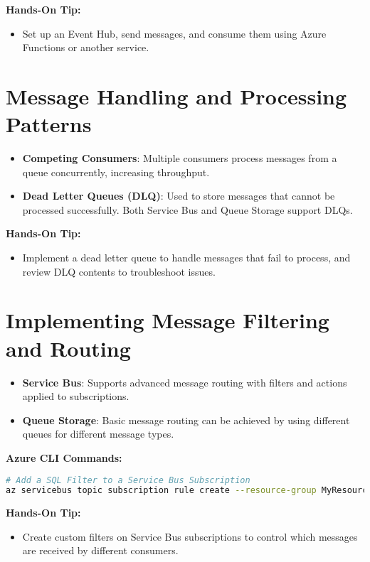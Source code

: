 \documentclass{article}
\begin{document}
\textbf{Hands-On Tip:}
\begin{itemize}
    \item Set up an Event Hub, send messages, and consume them using Azure Functions or another service.
\end{itemize}

\section{Message Handling and Processing Patterns}
\begin{itemize}
    \item \textbf{Competing Consumers}: Multiple consumers process messages from a queue concurrently, increasing throughput.
    \item \textbf{Dead Letter Queues (DLQ)}: Used to store messages that cannot be processed successfully. Both Service Bus and Queue Storage support DLQs.
\end{itemize}

\textbf{Hands-On Tip:}
\begin{itemize}
    \item Implement a dead letter queue to handle messages that fail to process, and review DLQ contents to troubleshoot issues.
\end{itemize}

\section{Implementing Message Filtering and Routing}
\begin{itemize}
    \item \textbf{Service Bus}: Supports advanced message routing with filters and actions applied to subscriptions.
    \item \textbf{Queue Storage}: Basic message routing can be achieved by using different queues for different message types.
\end{itemize}

\textbf{Azure CLI Commands:}
\begin{lstlisting}[language=bash]
# Add a SQL Filter to a Service Bus Subscription
az servicebus topic subscription rule create --resource-group MyResourceGroup --namespace-name MyServiceBusNamespace --topic-name MyTopic --subscription-name MySubscription --name MyRule --filter-sql-expression "myProperty = 'value'"
\end{lstlisting}

\textbf{Hands-On Tip:}
\begin{itemize}
    \item Create custom filters on Service Bus subscriptions to control which messages are received by different consumers.
\end{itemize}
\end{document}
